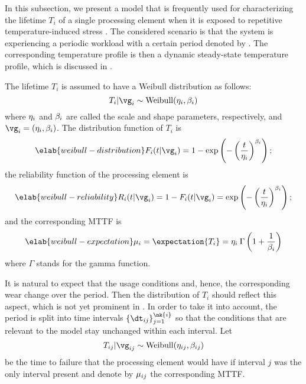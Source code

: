 In this subsection, we present a model that is frequently used for
characterizing the lifetime $T_i$ of a single processing element when it is
exposed to repetitive temperature-induced stress \cite{huang2009b, xiang2010}.
The considered scenario is that the system is experiencing a periodic workload
with a certain period denoted by \period. The corresponding temperature profile
is then a dynamic steady-state temperature profile, which is discussed in
.

The lifetime $T_i$ is assumed to have a Weibull distribution as follows:
\[
  T_i | \vg_i \sim \mathrm{Weibull}(\scale_i, \shape_i)
\]
where $\eta_i$ and $\beta_i$ are called the scale and shape parameters,
respectively, and $\vg_i = (\scale_i, \shape_i)$. The distribution function of
$T_i$ is
\begin{equation} \elab{weibull-distribution}
  F_i(t | \vg_i) = 1 - \exp\left(-\left(\frac{t}{\scale_i}\right)^{\shape_i}\right);
\end{equation}
the reliability function of the processing element is
\begin{equation} \elab{weibull-reliability}
  R_i(t | \vg_i) = 1 - F_i(t | \vg_i) = \exp\left(-\left(\frac{t}{\scale_i}\right)^{\shape_i}\right);
\end{equation}
and the corresponding \ac{MTTF} is
\begin{equation} \elab{weibull-expectation}
  \mean_i = \expectation{T_i} = \scale_i \: \Gamma\left(1 + \frac{1}{\shape_i}\right)
\end{equation}
where $\Gamma$ stands for the gamma function.

It is natural to expect that the usage conditions and, hence, the corresponding
wear change over the period. Then the distribution of $T_i$ should reflect this
aspect, which is not yet prominent in . In order to
take it into account, the period is split into  time intervals $\{
\dt_{ij} \}_{j = 1}^{\nk{i}}$ so that the conditions that are relevant to the
model stay unchanged within each interval. Let
\[
  T_{ij} | \vg_{ij} \sim \mathrm{Weibull}(\scale_{ij}, \shape_{ij})
\]
be the time to failure that the processing element would have if interval $j$
was the only interval present and denote by $\mu_{ij}$ the corresponding
\ac{MTTF}.

